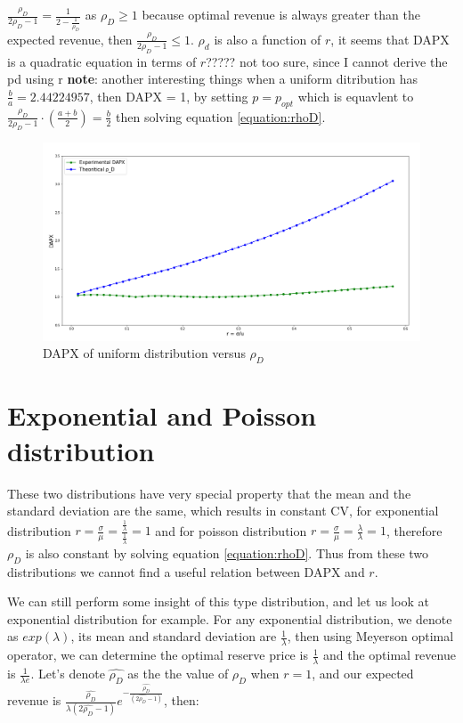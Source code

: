 $ \frac{ \rho_{D}}{2\rho_{D}-1} = \frac{1}{2-\frac{1}{\rho_D}}$ as $\rho_D \geqslant 1$ because optimal revenue is always greater than the expected revenue, then $\frac{ \rho_{D}}{2\rho_{D}-1} \leqslant 1$. 
$\rho_d$ is also a function of $r$, it seems that DAPX is a quadratic equation in terms of $r$????? not too sure, since I cannot derive the pd using r
\textbf{note}: another interesting things when a uniform ditribution has $\frac{b}{a} = 2.44224957$, then DAPX = 1, by setting $p = p_{opt} $ which is equavlent to $\frac{\rho_{D}}{2\rho_{D}-1}\cdot (\frac{a+b}{2}) = \frac{b}{2}$ then solving equation \ref{equation:rhoD}.
\begin{figure}[H]
	\centering
	\includegraphics[width=1\textwidth]{uniform_dapx}
	\caption{DAPX of uniform distribution versus $\rho_{D}$}
	\label{fig:uniform_dapx}
\end{figure}



\section{Exponential and Poisson distribution}

These two distributions have very special property that the mean and the standard deviation are the same, which results in constant CV, for exponential distribution $r = \frac{\sigma}{\mu} = \frac{\frac{1}{\lambda}}{\frac{1}{\lambda}} = 1$ and for poisson distribution $r = \frac{\sigma}{\mu} = \frac{\lambda}{\lambda} = 1$, therefore $\rho_D$ is also constant by solving equation \ref{equation:rhoD}. Thus from these two distributions we cannot find a useful relation between DAPX and $r$. 

We can still perform some insight of this type distribution, and let us look at exponential distribution for example. For any exponential distribution, we denote as $exp(\lambda)$, its mean and standard deviation are $\frac{1}{\lambda}$, then using Meyerson optimal operator, we can determine the optimal reserve price is $\frac{1}{\lambda}$ and the optimal revenue is $\frac{1}{\lambda e}$. Let's denote $\hat{\rho_D}$ as the the value of $\rho_D$ when $r = 1$, and our expected revenue is $\frac{\hat{\rho_D}}{\lambda (2\hat{\rho_D} - 1)}e^{- \frac{\hat{\rho_D}}{(2\hat{\rho_D} - 1)}}$, then:

